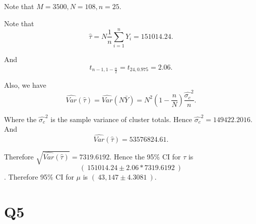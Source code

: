 \documentclass[12pt]{article}%
\begin{document}
Note that $M=3500, N=108, n=25.$ 

Note that $$\hat{\tau}=N\frac{1}{n}\sum_{i=1}^{n}Y_i=151014.24.$$

And $$t_{n-1,1-\frac{\alpha}{2}}=t_{24,0.975}=2.06.$$

Also, we have $$\hat{Var}(\hat{\tau})=\hat{Var}(N\bar{Y})=N^2(1-\frac{n}{N})\frac{\hat{\sigma_c}^2}{n}.$$

Where the $\hat{\sigma_c}^2$ is the sample variance of cluster totals. Hence $\hat{\sigma_c}^2=149422.2016.$ And $$\hat{Var}(\hat{\tau})=53576824.61.$$

Therefore $\sqrt{\hat{Var}(\hat{\tau})}=7319.6192.$ Hence the 95\% CI for $\tau$ is $$(~151014.24 \pm 2.06*7319.6192~)$$. Therefore 95\% CI for $\mu$ is $(~43,147 \pm 4.3081~).$


\section{Q5}
\end{document}
